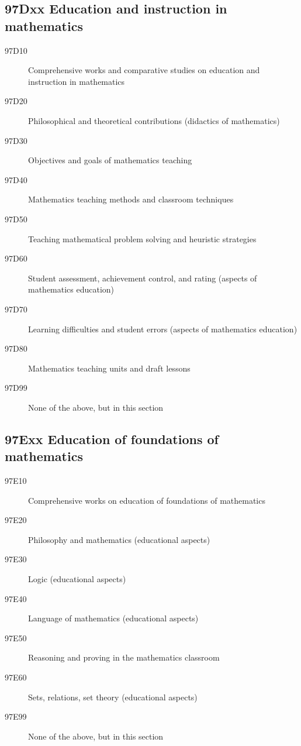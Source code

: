 \documentclass[letterpaper]{article}
\begin{document}
\subsection*{97Dxx  Education and instruction in mathematics }\label{97Dxx}
\begin{description}  
\item [97D10]\label{97D10} Comprehensive works and comparative studies on education and instruction in mathematics
\item [97D20]\label{97D20} Philosophical and theoretical contributions (didactics of mathematics) 
\item [97D30]\label{97D30} Objectives and goals of mathematics teaching
\item [97D40]\label{97D40} Mathematics teaching methods and classroom techniques 
\item [97D50]\label{97D50} Teaching mathematical problem solving and heuristic strategies
\item [97D60]\label{97D60} Student assessment, achievement control, and rating (aspects of mathematics education)
\item [97D70]\label{97D70} Learning difficulties and student errors (aspects of mathematics education)
\item [97D80]\label{97D80} Mathematics teaching units and draft lessons
\item [97D99]\label{97D99} None of the above, but in this section
\end{description}
\subsection*{97Exx Education of foundations of mathematics }\label{97Exx}
\begin{description}  
\item [97E10]\label{97E10} Comprehensive works on education of foundations of mathematics
\item [97E20]\label{97E20} Philosophy and mathematics (educational aspects)
\item [97E30]\label{97E30} Logic (educational aspects)
\item [97E40]\label{97E40} Language of mathematics (educational aspects)
\item [97E50]\label{97E50} Reasoning and proving in the mathematics classroom
\item [97E60]\label{97E60} Sets, relations, set theory (educational aspects)
\item [97E99]\label{97E99} None of the above, but in this section
\end{description}
\end{document}
